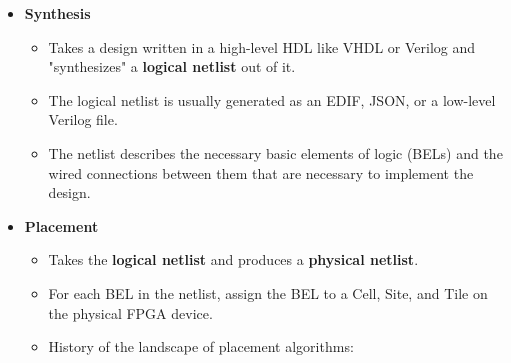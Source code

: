\documentclass{article}
\begin{document}
\begin{itemize}[label={\textbullet}, left=0.25cm]
    \item \textbf{Synthesis}
    \begin{itemize}[label={--}, left=0.25cm]
        \item Takes a design written in a high-level HDL like VHDL or Verilog and "synthesizes" a \textbf{logical netlist} out of it. 
        \item The logical netlist is usually generated as an EDIF, JSON, or a low-level Verilog file. 
        \item The netlist describes the necessary basic elements of logic (BELs) and the wired connections between them that are necessary to implement the design.
    \end{itemize}

    \item \textbf{Placement}
    \begin{itemize}[label={--}, left=0.25cm]
        \item Takes the \textbf{logical netlist} and produces a \textbf{physical netlist}.
        \item For each BEL in the netlist, assign the BEL to a Cell, Site, and Tile on the physical FPGA device.
        \item History of the landscape of placement algorithms:
    \end{itemize}


\end{itemize}
\end{document}

